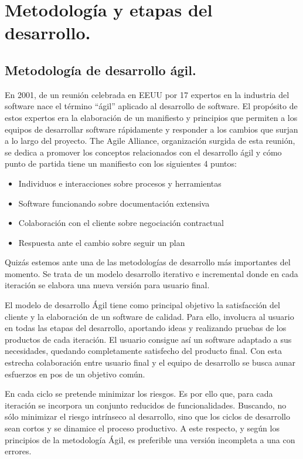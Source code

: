 \section{Metodología y etapas del desarrollo.}

\subsection{Metodología de desarrollo ágil.}

En 2001, de un reunión celebrada en EEUU por 17 expertos en la industria del software nace el término “ágil” aplicado al desarrollo de software. El propósito de estos expertos era la elaboración de un manifiesto y principios que permiten a los equipos de desarrollar software rápidamente y responder a los cambios que surjan a lo largo del proyecto. The Agile Alliance, organización surgida de esta reunión, se dedica a promover los conceptos relacionados con el desarrollo ágil y cómo punto de partida tiene un manifiesto con los siguientes 4 puntos:

\begin{itemize}
\item Individuos e interacciones sobre procesos y herramientas
\item Software funcionando sobre documentación extensiva
\item Colaboración con el cliente sobre negociación contractual
\item Respuesta ante el cambio sobre seguir un plan
\end{itemize}

Quizás estemos ante una de las metodologías de desarrollo más importantes del momento. Se trata de un modelo desarrollo iterativo e incremental donde en cada iteración se elabora una nueva versión para usuario final.

El modelo de desarrollo Ágil tiene como principal objetivo la satisfacción del cliente y la elaboración de un software de calidad. Para ello, involucra al usuario en todas las etapas del desarrollo, aportando ideas y realizando pruebas de los productos de cada iteración. El usuario consigue así un software adaptado a sus necesidades, quedando completamente satisfecho del producto final. Con esta estrecha colaboración entre usuario final y el equipo de desarrollo se busca  aunar esfuerzos en pos de un objetivo común.

En cada ciclo se pretende minimizar los riesgos. Es por ello que, para cada iteración se incorpora un conjunto reducidos de funcionalidades. Buscando, no sólo minimizar el riesgo intrínseco al desarrollo, sino que los ciclos de desarrollo sean cortos y se dinamice el proceso productivo. A este respecto, y según los principios de la metodología Ágil, es preferible una  versión incompleta a una con errores.  

